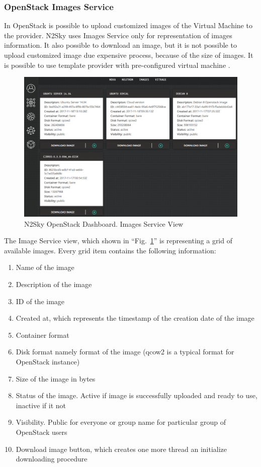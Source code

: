 \subsubsection{OpenStack Images Service}\label{OpenStack Images Service}

In OpenStack is possible to upload customized images of the Virtual Machine to the provider. N2Sky uses Images Service only for representation of images information. It also possible to download an image, but it is not possible to upload customized image due expensive process, because of the size of images. It is possible to use template provider with pre-configured virtual machine \cite{images}. 


\begin{figure}[H]
\begin{center}
  \includegraphics[width=\linewidth]{components/4/pics/openstack_images.png}
  \caption{N2Sky OpenStack Dashboard. Images Service View}
  \label{fig:openstack_images}
\end{center}
\end{figure}

The Image Service view, which shown in ``Fig.~\ref{fig:openstack_images}'' is representing a grid of available images. Every grid item contains the following information: 
\begin{enumerate}
\item Name of the image
\item Description of the image
\item ID of the image
\item Created at, which represents the timestamp of the creation date of the image
\item Container format
\item Disk format namely format of the image (qcow2 is a typical format for OpenStack instance)
\item Size of the image in bytes
\item Status of the image. Active if image is successfully uploaded and ready to use, inactive if it not
\item Visibility. Public for everyone or group name for particular group of OpenStack users
\item Download image button, which creates one more thread an initialize downloading procedure
\end{enumerate}

